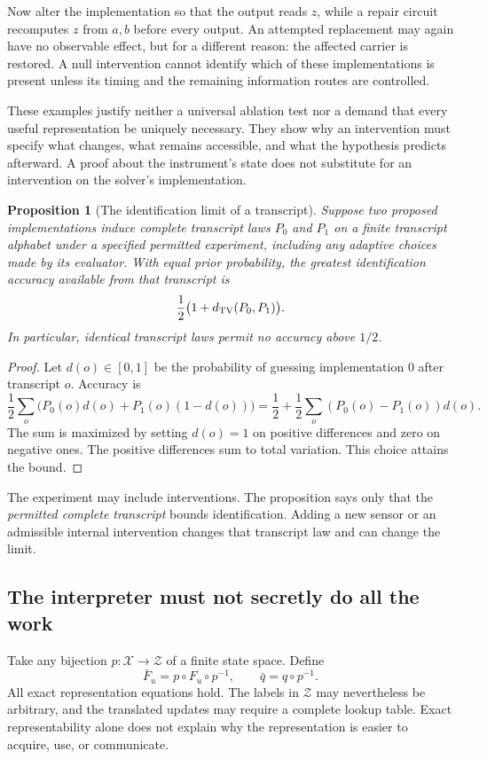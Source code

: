 \documentclass[11pt,letterpaper]{article}
\theoremstyle{plain}
\newtheorem{proposition}[theorem]{Proposition}
\theoremstyle{definition}
\newcommand{\X}{\mathcal X}\newcommand{\Z}{\mathcal Z}
\begin{document}
Now alter the implementation so that the output reads $z$, while a repair circuit recomputes $z$ from $a,b$ before every output. An attempted replacement may again have no observable effect, but for a different reason: the affected carrier is restored. A null intervention cannot identify which of these implementations is present unless its timing and the remaining information routes are controlled.

These examples justify neither a universal ablation test nor a demand that every useful representation be uniquely necessary. They show why an intervention must specify what changes, what remains accessible, and what the hypothesis predicts afterward. A proof about the instrument's state does not substitute for an intervention on the solver's implementation.

\begin{proposition}[The identification limit of a transcript]\label{prop:identification}
Suppose two proposed implementations induce complete transcript laws $P_0$ and $P_1$ on a finite transcript alphabet under a specified permitted experiment, including any adaptive choices made by its evaluator. With equal prior probability, the greatest identification accuracy available from that transcript is
\[
\frac12\bigl(1+d_{\mathrm{TV}}(P_0,P_1)\bigr).
\]
In particular, identical transcript laws permit no accuracy above $1/2$.
\end{proposition}
\begin{proof}
Let $d(o)\in[0,1]$ be the probability of guessing implementation 0 after transcript $o$. Accuracy is
\[
\frac12\sum_o\bigl(P_0(o)d(o)+P_1(o)(1-d(o))\bigr)
=\frac12+\frac12\sum_o(P_0(o)-P_1(o))d(o).
\]
The sum is maximized by setting $d(o)=1$ on positive differences and zero on negative ones. The positive differences sum to total variation. This choice attains the bound.
\end{proof}
The experiment may include interventions. The proposition says only that the \emph{permitted complete transcript} bounds identification. Adding a new sensor or an admissible internal intervention changes that transcript law and can change the limit.

\subsection{The interpreter must not secretly do all the work}
Take any bijection $p:\X\to\Z$ of a finite state space. Define
\[
\bar F_u=p\circ F_u\circ p^{-1},\qquad \bar q=q\circ p^{-1}.
\]
All exact representation equations hold. The labels in $\Z$ may nevertheless be arbitrary, and the translated updates may require a complete lookup table. Exact representability alone does not explain why the representation is easier to acquire, use, or communicate.
\end{document}
